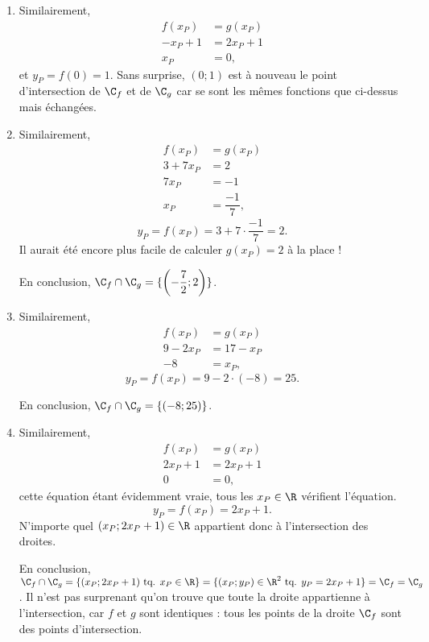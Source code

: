 {\begin{enumerate}
		\item 
			Similairement,
			\begin{align*}
				f(x_P) &= g(x_P) \\
				-x_P + 1 & = 2x_P + 1 \\
				x_P &= 0,
			\end{align*}
			et $y_P = f(0) = 1$.
			Sans surprise, $(0;1)$ est à nouveau le point d'intersection de $\C_f$ et de $\C_g$ car se sont les mêmes fonctions que ci-dessus mais échangées.
		
		\item 
			Similairement,
			\begin{align*}
				f(x_P) &= g(x_P) \\
				3 + 7x_P & = 2 \\
				7x_P &= -1 \\
				x_P &= \dfrac{-1}7,
			\end{align*}
			\[
				y_P = f(x_P) = 3+7\cdot \dfrac{-1}7  = 2.
			\]
			Il aurait été encore plus facile de calculer $g(x_P) = 2$ à la place !
			
			En conclusion, $\C_f \cap \C_g = \{ \left(-\dfrac72 ; 2\right) \}$.
		
		\item
			Similairement,
			\begin{align*}
				f(x_P) &= g(x_P) \\
				9-2x_P & = 17-x_P \\
				-8 &= x_P,
			\end{align*}
			\[
				y_P = f(x_P) = 9-2 \cdot(-8) = 25.
			\]
		
			En conclusion, $\C_f \cap \C_g = \{ (-8;25) \}$.
		
		\item 			
		Similairement,
			\begin{align*}
				f(x_P) &= g(x_P) \\
				2x_P + 1 & = 2x_P + 1 \\
				0 &= 0,
			\end{align*}
			cette équation étant évidemment vraie, tous les $x_P \in \R$ vérifient l'équation.
			\[
				y_P = f(x_P) = 2x_P + 1.
			\]
			N'importe quel $(x_P ; 2x_P+1) \in \R$ appartient donc à l'intersection des droites.
			
			En conclusion, $\C_f \cap \C_g = \{ (x_P ; 2x_P+1) \text{ tq. } x_P \in \R \} = \{ (x_P ; y_P) \in \R^2 \text{ tq. } y_P = 2x_P + 1 \} = \C_f = \C_g$.
			Il n'est pas surprenant qu'on trouve que toute la droite appartienne à l'intersection, car $f$ et $g$ sont identiques : tous les points de la droite $\C_f$ sont des points d'intersection.
		

\end{enumerate}}
